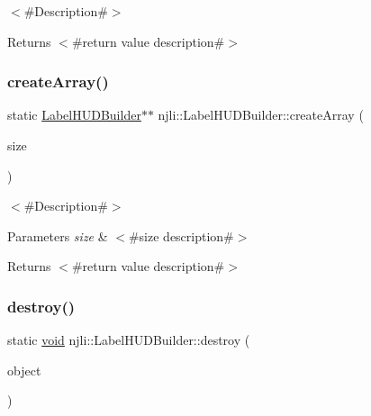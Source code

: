 $<$\#\+Description\#$>$

\begin{DoxyReturn}{Returns}
$<$\#return value description\#$>$ 
\end{DoxyReturn}
\mbox{\label{classnjli_1_1_label_h_u_d_builder_aca3bb53dfeb5df96087f7ef7d861c7f3}} 
\subsubsection{\texorpdfstring{create\+Array()}{createArray()}}
{\footnotesize\ttfamily static \mbox{\hyperlink{classnjli_1_1_label_h_u_d_builder}{Label\+H\+U\+D\+Builder}}$\ast$$\ast$ njli\+::\+Label\+H\+U\+D\+Builder\+::create\+Array (\begin{DoxyParamCaption}\item[{const \mbox{\hyperlink{_util_8h_a10e94b422ef0c20dcdec20d31a1f5049}{u32}}}]{size }\end{DoxyParamCaption})\hspace{0.3cm}{\ttfamily [static]}}

$<$\#\+Description\#$>$


\begin{DoxyParams}{Parameters}
{\em size} & $<$\#size description\#$>$\\
\hline
\end{DoxyParams}
\begin{DoxyReturn}{Returns}
$<$\#return value description\#$>$ 
\end{DoxyReturn}
\mbox{\label{classnjli_1_1_label_h_u_d_builder_a6651f48628a7bddbc66bf39b52f46491}} 
\subsubsection{\texorpdfstring{destroy()}{destroy()}}
{\footnotesize\ttfamily static \mbox{\hyperlink{_thread_8h_af1e856da2e658414cb2456cb6f7ebc66}{void}} njli\+::\+Label\+H\+U\+D\+Builder\+::destroy (\begin{DoxyParamCaption}\item[{\mbox{\hyperlink{classnjli_1_1_label_h_u_d_builder}{Label\+H\+U\+D\+Builder}} $\ast$}]{object }\end{DoxyParamCaption})\hspace{0.3cm}{\ttfamily [static]}}


